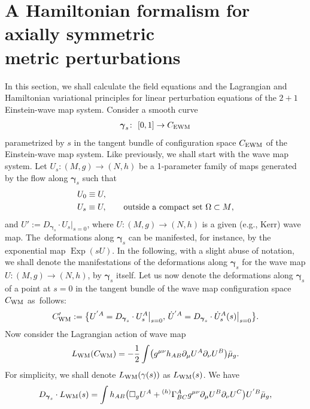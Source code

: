 \documentclass[11pt]{article}
\numberwithin{equation}{section}
\def\ptl{\partial}%
\def\mbo#1{\boldsymbol{#1}}%
\newcommand{\leftexp}[2]{{\vphantom{#2}}^{#1}{#2}}
\def\halb{\frac{1}{2}}%
\numberwithin{equation}{section}
\begin{document}
\section[A Hamiltonian formalism for axially symmetric metric perturbations]{A Hamiltonian formalism for axially symmetric\\ metric perturbations}\label{section3}

In this section, we shall calculate the field equations and the Lagrangian and Hamiltonian variational principles for linear perturbation equations of the $2 + 1$ Einstein-wave map system. Consider a smooth curve
\begin{align*}
\mbo{\gamma}_s \colon\ [0, 1] \to C_{{\rm EWM}}
\end{align*}
parametrized by $s$ in the tangent bundle of configuration space $C_{{\rm EWM}}$ of the Einstein-wave map system. Like previously, we shall start with the wave map system. Let $U_s \colon (M, g) \to (N, h)$ be a 1-parameter family of maps generated by the flow along $\mbo{\gamma}_s$ such that
\begin{align*}
&U_0 \equiv U, \\
& U_s \equiv U, \qquad \textnormal{outside a compact set $\Omega \subset M$},
\end{align*}
and $ U' := D_{\mbo{\gamma}_s} \cdot U_s \big\vert_{s=0}$, where $U \colon (M, g) \to (N, h)$ is a given (e.g., Kerr) wave map. The~deformations along $\mbo{\gamma}_s$ can be manifested, for instance, by the exponential map $\operatorname{Exp}(s U)$. In the following, with a slight abuse of notation, we shall denote the manifestations of the deformations along $\mbo{\gamma}_s$ for the wave map $U \colon (M,g) \to (N, h)$, by $\mbo{\gamma}_s$ itself. Let us now denote the deformations along $\mbo{\gamma}_s$ of a point at $s=0$ in the tangent bundle of the wave map configuration space $C_{{\rm WM}}$ as~follows:
\begin{align*}
C'_{ {\rm WM}} := \bigl\{
U^{'A} = D_{\mbo{\gamma}_s} \cdot U_s^{A} \big\vert_{s=0}, \, \dot{U}^{'A} = D_{\mbo{\gamma}_s} \cdot \dot{U}_s^{A} (s) \big\vert_{s=0} \bigr\}.
\end{align*}
Now consider the Lagrangian action of wave map
\begin{align} \label{wm-action-again}
L_{{\rm WM}} (C_{{\rm WM}}) = -\halb \int \bigl(g^{\mu \nu}h_{AB} \ptl_\mu U^A \ptl_\nu U^B\bigr) \bar{\mu}_g.
\end{align}
For simplicity, we shall denote $L_{{\rm WM}}(\gamma(s))$ as $L_{{\rm WM}}(s)$. We have
\begin{align}\label{1-var-wm}
D_{\mbo{\gamma}_s} \cdot L_{{\rm WM}}(s) = \int h_{AB} \bigl(\square_g U^A + \leftexp{(h)}{\Gamma}^A_{BC} g^{\mu \nu} \ptl_\mu U^B \ptl_\nu U^C\bigr) U^{'B} \bar{\mu}_g,
\end{align}
\end{document}
